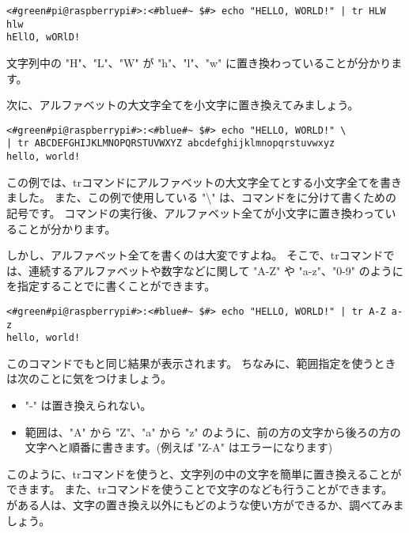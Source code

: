 \begin{lstlisting}[caption=3文字の置き換え, label=tr_3_chars]
<#green#pi@raspberrypi#>:<#blue#~ $#> echo "HELLO, WORLD!" | tr HLW hlw
hEllO, wORlD!
\end{lstlisting}

文字列中の "H"、"L"、"W" が "h"、"l"、"w" に置き換わっていることが分かります。

次に、アルファベットの大文字全てを小文字に置き換えてみましょう。

\begin{lstlisting}[caption=アルファベット全体の置き換え, label=tr_all_chars]
<#green#pi@raspberrypi#>:<#blue#~ $#> echo "HELLO, WORLD!" \
| tr ABCDEFGHIJKLMNOPQRSTUVWXYZ abcdefghijklmnopqrstuvwxyz
hello, world!
\end{lstlisting}

この例では、trコマンドにアルファベットの大文字全てとする小文字全てを書きました。
また、この例で使用している "\textbackslash" は、コマンドをに分けて書くための記号です。
コマンドの実行後、アルファベット全てが小文字に置き換わっていることが分かります。

しかし、アルファベット全てを書くのは大変ですよね。
そこで、trコマンドでは、連続するアルファベットや数字などに関して "A-Z" や "a-z"、"0-9"
のようにを指定することでに書くことができます。

\begin{lstlisting}[caption=範囲指定を使った置き換え, label=tr_range]
<#green#pi@raspberrypi#>:<#blue#~ $#> echo "HELLO, WORLD!" | tr A-Z a-z
hello, world!
\end{lstlisting}

このコマンドでもと同じ結果が表示されます。
ちなみに、範囲指定を使うときは次のことに気をつけましょう。
\begin{itemize}
    \item "-" は置き換えられない。
    \item 範囲は、"A" から "Z"、"a" から "z" のように、前の方の文字から後ろの方の文字へと順番に書きます。(例えば "Z-A"
          はエラーになります)
\end{itemize}

このように、trコマンドを使うと、文字列の中の文字を簡単に置き換えることができます。
また、trコマンドを使うことで文字のなども行うことができます。
がある人は、文字の置き換え以外にもどのような使い方ができるか、調べてみましょう。

